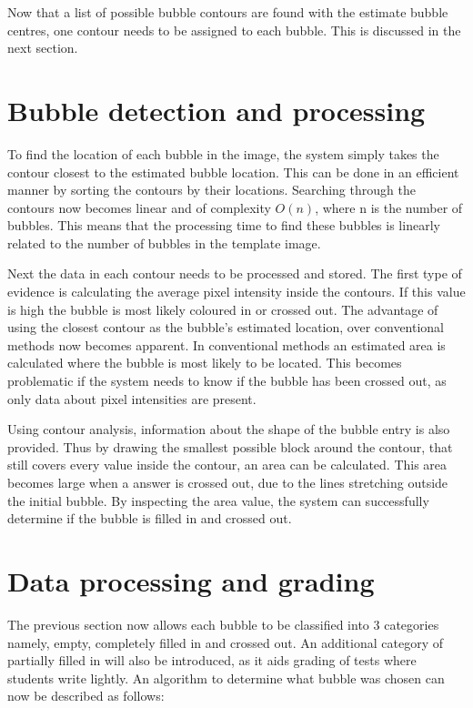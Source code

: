 Now that a list of possible bubble contours are found with the estimate bubble centres, one contour needs to be assigned to each bubble. This is discussed in the next section.

\section{Bubble detection and processing}
To find the location of each bubble in the image, the system simply takes the contour closest to the estimated bubble location. This can be done in an efficient manner by sorting the contours by their locations. Searching through the contours now becomes linear and of complexity $O(n)$, where n is the number of bubbles. This means that the processing time to find these bubbles is linearly related to the number of bubbles in the template image. 

Next the data in each contour needs to be processed and stored. The first type of evidence is calculating the average pixel intensity inside the contours. If this value is high the bubble is most likely coloured in or crossed out. The advantage of using the closest contour as the bubble's estimated location, over conventional methods now becomes apparent. In conventional methods an estimated area is calculated where the bubble is most likely to be located. This becomes problematic if the system needs to know if the bubble has been crossed out, as only data about pixel intensities are present. 

Using contour analysis, information about the shape of the bubble entry is also provided. Thus by drawing the smallest possible block around the contour, that still covers every value inside the contour, an area can be calculated. This area becomes large when a answer is crossed out, due to the lines stretching outside the initial bubble. By inspecting the area value, the system can successfully determine if the bubble is filled in and crossed out.

\section{Data processing and grading}

The previous section now allows each bubble to be classified into 3 categories namely, empty, completely filled in and crossed out. An additional category of partially filled in will also be introduced, as it aids grading of tests where students write lightly. An algorithm to determine what bubble was chosen can now be described as follows:

